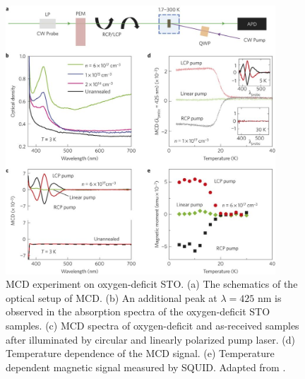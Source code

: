 \documentclass[pdflatex, sectionletters, 12pt]{pittetd}    %
\begin{document}
\begin{figure}[p]
	\centering
	\includegraphics[width=0.9\textwidth]{Drawing/MCDRice.jpg}
	\caption{MCD experiment on oxygen-deficit STO. (a) The schematics of the optical setup of MCD. (b) An additional peak at $\lambda=425$ nm is observed in the absorption spectra of the oxygen-deficit STO samples. (c) MCD spectra of oxygen-deficit and as-received samples after illuminated by circular and linearly polarized pump laser. (d) Temperature dependence of the MCD signal. (e) Temperature dependent magnetic signal measured by SQUID. Adapted from \cite{rice2014persistent}.}
	\label{FIG:MCDRice}
\end{figure}
\end{document}
